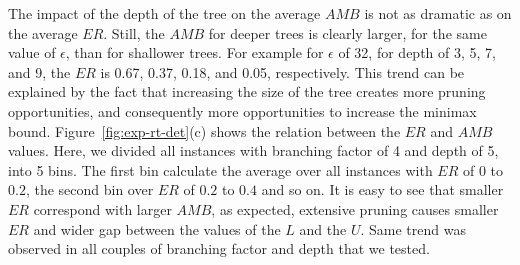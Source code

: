 \documentclass[letterpaper]{article} %
\newcommand{\pess}{\mathit{L}}
\newcommand{\opti}{\mathit{U}}
\newcommand{\amb}{\textit{AMB}}
\newcommand{\er}{\textit{ER}}
\begin{document}
The impact of the depth of the tree on the average $\amb$ is not as dramatic as on the average $\er$.
Still, the $\amb$ for deeper trees is clearly larger, for the same value of $\epsilon$, than for shallower trees.
For example for $\epsilon$ of 32, for depth of 3, 5, 7, and 9, the $\er$ is 0.67, 0.37, 0.18, and 0.05, respectively.
This trend can be explained by the fact that increasing the size of the tree creates more pruning opportunities, and consequently more opportunities to increase the minimax bound. 
Figure~\ref{fig:exp-rt-det}(c) shows the relation between the $\er$ and $\amb$ values.
Here, we divided all instances with branching factor of 4 and depth of 5, into 5 bins.
The first bin calculate the average over all instances with $\er$ of $0$ to $0.2$, the second bin over $\er$ of $0.2$ to $0.4$ and so on.
It is easy to see that smaller $\er$ correspond with larger $\amb$, as expected, extensive pruning causes smaller $\er$ and wider gap between the values of the $\pess$ and the $\opti$.
Same trend was observed in all couples of branching factor and depth that we tested. 
\end{document}
